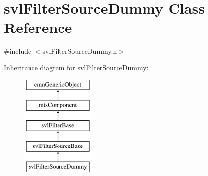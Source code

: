 \hypertarget{classsvl_filter_source_dummy}{}\section{svl\+Filter\+Source\+Dummy Class Reference}
\label{classsvl_filter_source_dummy}


{\ttfamily \#include $<$svl\+Filter\+Source\+Dummy.\+h$>$}

Inheritance diagram for svl\+Filter\+Source\+Dummy\+:\begin{figure}[H]
\begin{center}
\leavevmode
\includegraphics[height=5.000000cm]{de/d45/classsvl_filter_source_dummy}
\end{center}
\end{figure}
